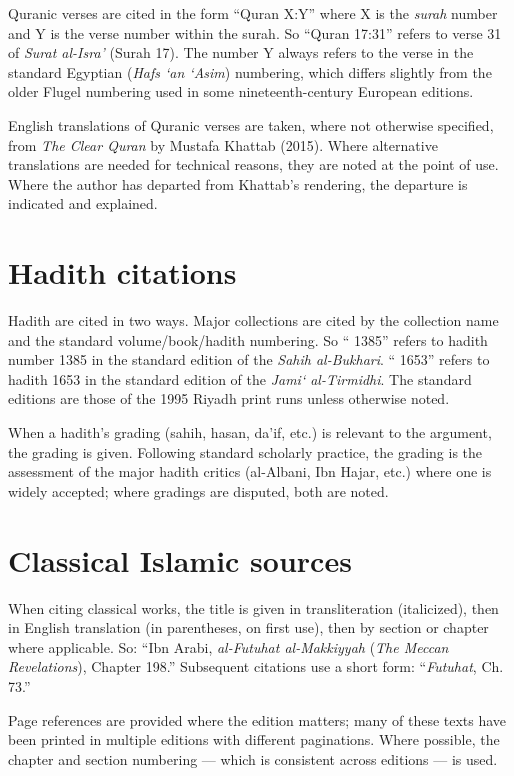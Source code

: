 Quranic verses are cited in the form ``Quran X:Y'' where X is the
\textit{surah} number and Y is the verse number within the surah. So
``Quran 17:31'' refers to verse 31 of \textit{Surat al-Isra'} (Surah
17). The number Y always refers to the verse in the standard
Egyptian (\textit{Hafs `an `Asim}) numbering, which differs slightly
from the older Flugel numbering used in some nineteenth-century
European editions.

English translations of Quranic verses are taken, where not otherwise
specified, from \textit{The Clear Quran} by Mustafa Khattab (2015).
Where alternative translations are needed for technical reasons, they
are noted at the point of use. Where the author has departed from
Khattab's rendering, the departure is indicated and explained.

\section*{Hadith citations}

Hadith are cited in two ways. Major collections are cited by the
collection name and the standard volume/book/hadith numbering. So
`` 1385'' refers to hadith number 1385 in the standard
edition of the \textit{Sahih al-Bukhari}. `` 1653''
refers to hadith 1653 in the standard edition of the
\textit{Jami` al-Tirmidhi}. The standard editions are those of the
1995 Riyadh print runs unless otherwise noted.

When a hadith's grading (sahih, hasan, da'if, etc.) is relevant to the
argument, the grading is given. Following standard scholarly
practice, the grading is the assessment of the major hadith critics
(al-Albani, Ibn Hajar, etc.) where one is widely accepted; where
gradings are disputed, both are noted.

\section*{Classical Islamic sources}

When citing classical works, the title is given in transliteration
(italicized), then in English translation (in parentheses, on first
use), then by section or chapter where applicable. So:
``Ibn Arabi, \textit{al-Futuhat al-Makkiyyah} (\textit{The Meccan
Revelations}), Chapter 198.'' Subsequent citations use a short form:
``\textit{Futuhat}, Ch. 73.''

Page references are provided where the edition matters; many of these
texts have been printed in multiple editions with different
paginations. Where possible, the chapter and section numbering ---
which is consistent across editions --- is used.

